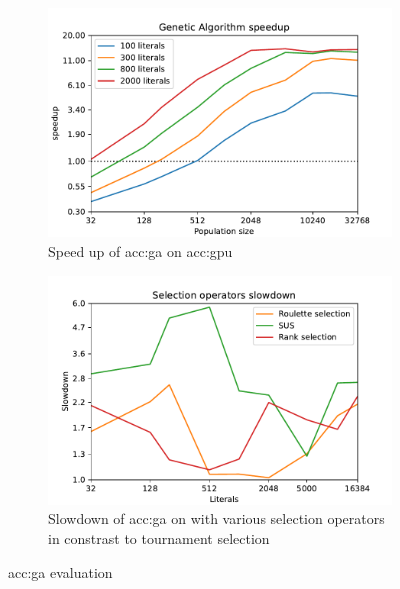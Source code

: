 \begin{figure}
    \begin{subfigure}[t]{0.45\textwidth}
        \includegraphics[width=\textwidth]{img/runs/speedup_ga.pdf}
        \caption{Speed up of \acrshort*{acc:ga} on \acrshort*{acc:gpu}}
        \label{fig:gpugaspeedup}
    \end{subfigure}
    \hfill
    \begin{subfigure}[t]{0.45\textwidth}
        \includegraphics[width=\textwidth]{img/runs/time_ga_selection_slowdown.pdf}
        \caption[Slowdown of GA selection operators]{Slowdown of \acrshort*{acc:ga} on \gpu with various selection operators in constrast to tournament selection}
        \label{fig:gpugaselectionslowdown}
    \end{subfigure}

    \caption{\acrlong*{acc:ga} evaluation}
\end{figure}

